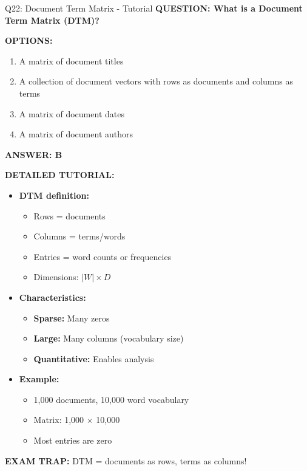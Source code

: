 \documentclass[8pt]{beamer}
\begin{document}
	\begin{frame}{Q22: Document Term Matrix - Tutorial}
		\fontsize{6.5}{7.5}\selectfont
		\textbf{QUESTION: What is a Document Term Matrix (DTM)?}
		
		\vspace{0.1cm}
		\textbf{OPTIONS:}
		\begin{enumerate}
			\item A matrix of document titles
			\item A collection of document vectors with rows as documents and columns as terms
			\item A matrix of document dates
			\item A matrix of document authors
		\end{enumerate}
		
		\vspace{0.1cm}
		\textcolor{myblue}{\textbf{ANSWER: B}}
		
		\vspace{0.1cm}
		\textbf{DETAILED TUTORIAL:}
		\begin{itemize}
			\item \textbf{DTM definition:}
			\begin{itemize}
				\item Rows = documents
				\item Columns = terms/words
				\item Entries = word counts or frequencies
				\item Dimensions: $|W| \times D$
			\end{itemize}
			\item \textbf{Characteristics:}
			\begin{itemize}
				\item \textbf{Sparse:} Many zeros
				\item \textbf{Large:} Many columns (vocabulary size)
				\item \textbf{Quantitative:} Enables analysis
			\end{itemize}
			\item \textbf{Example:}
			\begin{itemize}
				\item 1,000 documents, 10,000 word vocabulary
				\item Matrix: 1,000 × 10,000
				\item Most entries are zero
			\end{itemize}
		\end{itemize}
		
		\textcolor{myred}{\textbf{EXAM TRAP:}} DTM = \textcolor{myblue}{documents as rows, terms as columns}!
	\end{frame}
	
\end{document}
